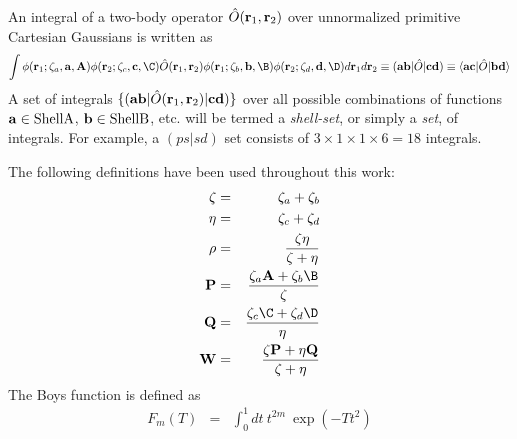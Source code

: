 \documentclass[10pt]{article}
\providecommand{\braket}[1]{\ensuremath{\langle #1 \rangle}}
\begin{document}
An integral of a two-body operator $\hat{O}({\bf r}_1, {\bf r}_2)$ over unnormalized
primitive Cartesian Gaussians is written as
\begin{eqnarray}
\int \phi({\bf r}_1; \zeta_a, {\bf a}, {\bf A}) \phi ({\bf r}_2; \zeta_c, {\bf c}, \C) \hat{O}({\bf r}_1, {\bf r}_2)
\phi({\bf r}_1; \zeta_b, {\bf b}, \B) \phi({\bf r}_2; \zeta_d, {\bf d}, \D)
d{\bf r}_1 d{\bf r}_2 \equiv ({\bf ab} |\hat{O}|{\bf cd}) \equiv \braket{ {\bf
ac} | \hat{O} | {\bf bd} }
\end{eqnarray}
A set of integrals $\{ ({\bf a} {\bf b}|\hat{O}({\bf r}_1, {\bf r}_2)|{\bf c} {\bf d}) \}$
over all possible combinations of functions ${\bf a} \in {\rm Shell A}$, ${\bf b} \in {\rm Shell B}$, etc.
will be termed a {\em shell-set}, or simply a {\em set}, of integrals. For example, a $(ps|sd)$ set consists of
$3 \times 1 \times 1 \times 6 = 18$ integrals.

The following definitions have been used throughout this work:
\begin{eqnarray}
\zeta & = & \zeta_a + \zeta_b \\
\eta  & = & \zeta_c + \zeta_d \\
\rho  & = & \frac{\zeta\eta}{\zeta+\eta} \\
{\bf P}& = & \frac{\zeta_a {\bf A} + \zeta_b \B}{\zeta} \\
{\bf Q}& = & \frac{\zeta_c \C + \zeta_d \D}{\eta} \\
{\bf W}& = & \frac{\zeta {\bf P} + \eta {\bf Q}}{\zeta+\eta}
\end{eqnarray}
The Boys function is defined as
\begin{eqnarray}
F_m(T) & = & \int_0^{1} dt\ t^{2m}\ \exp (-Tt^2)
\end{eqnarray}
\end{document}

